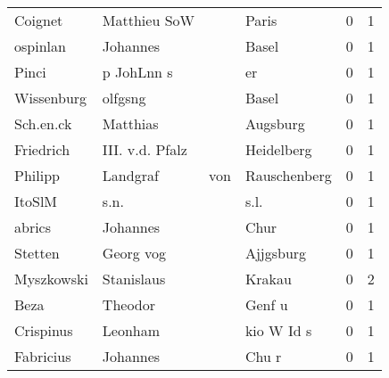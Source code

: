 \begin{tabular}{llllrr}
                  Coignet &                       Matthieu SoW &             &                                       Paris &          0 &         1 \\
                 ospinlan &                           Johannes &             &                                       Basel &          0 &         1 \\
                    Pinci &                         p JohLnn s &             &                                          er &          0 &         1 \\
               Wissenburg &                            olfgsng &             &                                       Basel &          0 &         1 \\
                Sch.en.ck &                           Matthias &             &                                    Augsburg &          0 &         1 \\
                Friedrich &                    III. v.d. Pfalz &             &                                  Heidelberg &          0 &         1 \\
                  Philipp &                           Landgraf &         von &                                Rauschenberg &          0 &         1 \\
                   ItoSlM &                               s.n. &             &                                        s.l. &          0 &         1 \\
                   abrics &                           Johannes &             &                                        Chur &          0 &         1 \\
                  Stetten &                          Georg vog &             &                                   Ajjgsburg &          0 &         1 \\
               Myszkowski &                         Stanislaus &             &                                      Krakau &          0 &         2 \\
                     Beza &                            Theodor &             &                                      Genf u &          0 &         1 \\
                Crispinus &                            Leonham &             &                                  kio W Id s &          0 &         1 \\
                Fabricius &                           Johannes &             &                                       Chu r &          0 &         1 \\

\end{tabular}
